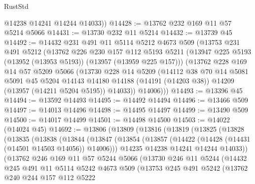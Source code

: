 \begin{lexlean}{RustStd}
\begin{coremodule}
        @14238
        @14241
        @14244
        @14033))
@14428 := @13762 @232 @169 @11 @57 @5214 @5066
@14431 := @13730 @232 @11 @5214
@14432 := @13739 @45
@14492 := @14432
    @231
    @491
    @11
    @5114
    @5212
    @4673
    @509
    (@13753
      @231
      @491
      @5212
      (@13762
        @226
        @230
        @157
        @112
        @5193
        @5211
        (@13947 @225 @5193 (@13952 (@13953 @5193)) (@13957 (@13959 @225 @157)))
        (@13762
          @228
          @169
          @14
          @57
          @5209
          @5066
          (@13730
            @228
            @14
            @5209
            (@14112
              @38
              @70
              @14
              @5081
              @5091
              @45
              @5204
              @14143
              @14180
              @14188
              (@14191 (@14203 @38))
              @14209
              (@13957 (@14211 @5204 @5195))
              @14033))
          @14006)))
@14493 := @13396 @45
@14494 := @13592 @14493
@14495 := @14492 @14494
@14496 := @13466 @509
@14497 := @14013 @14496
@14498 := @14495 @14497
@14499 := @13490 @509
@14500 := @14017 @14499
@14501 := @14498 @14500
@14503 := @14022 (@14024 @45)
@14692 := @13806
    (@13809
      (@13816
        (@13819
          (@13825
            (@13828
              (@13835
                (@13838
                  (@13844
                    (@13847
                      (@13854
                        (@13857 (@14422 (@14428 (@14431 (@14501 @14503 @14056)) @14006)))
                        @14235
                        @14238
                        @14241
                        @14244
                        @14033))
                    (@13762
                      @246
                      @169
                      @11
                      @57
                      @5244
                      @5066
                      (@13730
                        @246
                        @11
                        @5244
                        (@14432
                          @245
                          @491
                          @11
                          @5114
                          @5242
                          @4673
                          @509
                          (@13753
                            @245
                            @491
                            @5242
                            (@13762
                              @240
                              @244
                              @157
                              @112
                              @5222

\end{coremodule}
\end{lexlean}

